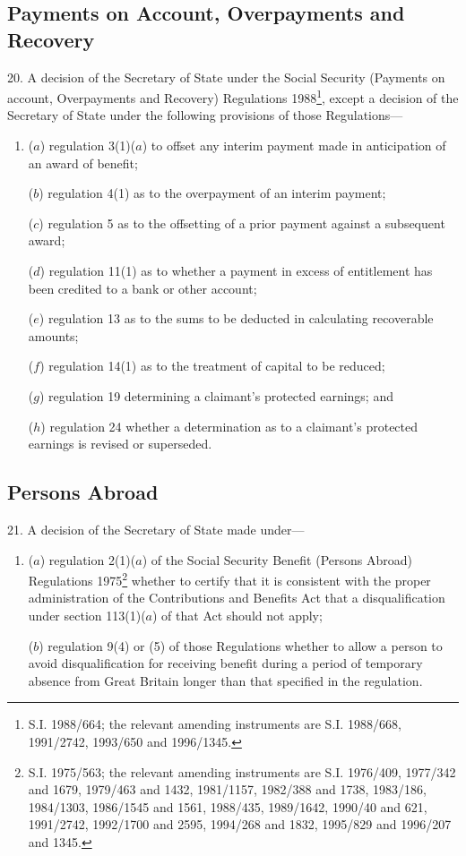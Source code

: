 \documentclass[12pt,a4paper]{article}
\begin{document}
\subsection*{Payments on Account, Overpayments and Recovery}

20.  A decision of the Secretary of State under the Social Security (Payments on account, Overpayments and Recovery) Regulations 1988\footnote{\frenchspacing S.I. 1988/664; the relevant amending instruments are S.I. 1988/668, 1991/2742, 1993/650 and 1996/1345.}, except a decision of the Secretary of State under the following provisions of those Regulations—
\begin{enumerate}\item[]
($a$) regulation 3(1)($a$) to offset any interim payment made in anticipation of an award of benefit;

($b$) regulation 4(1) as to the overpayment of an interim payment;

($c$) regulation 5 as to the offsetting of a prior payment against a subsequent award;

($d$) regulation 11(1) as to whether a payment in excess of entitlement has been credited to a bank or other account;

($e$) regulation 13 as to the sums to be deducted in calculating recoverable amounts;

($f$) regulation 14(1) as to the treatment of capital to be reduced;

($g$) regulation 19 determining a claimant’s protected earnings; and

($h$) regulation 24 whether a determination as to a claimant’s protected earnings is revised or superseded.
\end{enumerate}

\subsection*{Persons Abroad}

21.  A decision of the Secretary of State made under—
\begin{enumerate}\item[]
($a$) regulation 2(1)($a$) of the Social Security Benefit (Persons Abroad) Regulations 1975\footnote{\frenchspacing S.I. 1975/563; the relevant amending instruments are S.I. 1976/409, 1977/342 and 1679, 1979/463 and 1432, 1981/1157, 1982/388 and 1738, 1983/186, 1984/1303, 1986/1545 and 1561, 1988/435, 1989/1642, 1990/40 and 621, 1991/2742, 1992/1700 and 2595, 1994/268 and 1832, 1995/829 and 1996/207 and 1345.} whether to certify that it is consistent with the proper administration of the Contributions and Benefits Act that a disqualification under section 113(1)($a$) of that Act should not apply;

($b$) regulation 9(4) or (5) of those Regulations whether to allow a person to avoid disqualification for receiving benefit during a period of temporary absence from Great Britain longer than that specified in the regulation.
\end{enumerate}
\end{document}
